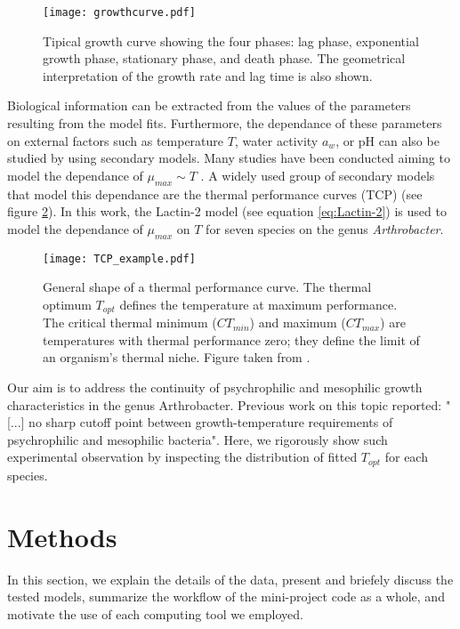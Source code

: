 \documentclass[titlepage,11pt]{article}
\begin{document}
\begin{linenumbers}
		\begin{figure}[h]
			\centering
			\texttt{[image: growthcurve.pdf]}
			\caption{Tipical growth curve showing the four phases: lag phase, exponential growth phase, stationary phase, and death phase. The geometrical interpretation of the growth rate and lag time is also shown.}
			\label{fig:growthcurve}
		\end{figure}
		Biological information can be extracted from the values of the parameters resulting from the model fits. Furthermore, the dependance of these parameters on external factors such as temperature $ T $, water activity $ a_w $, or pH can also be studied by using secondary models. Many studies have been conducted aiming to model the dependance of $ \mu_{max} \sim T $ \cite{Ratkowsky1982, Phillips1987, Stannard1985, DaSilva2018, Zwietering1991, Bernhardt2018, Lactin1995, Valik2013, Logan1976}.  A widely used group of secondary models that model this dependance are the thermal performance curves (TCP) (see figure \ref{fig:TCP_example}). In this work, the Lactin-2 model (see equation \ref{eq:Lactin-2}) is used to model the dependance of $ \mu_{max} $ on $ T $ for seven species on the genus \textit{Arthrobacter}.\\
		\begin{figure}[h]
			\centering
			\texttt{[image: TCP\_example.pdf]}
			\caption{General shape of a thermal performance curve. The thermal optimum $ T_{opt} $ defines the temperature at maximum performance. The critical thermal minimum ($ CT_{min} $) and maximum ($ CT_{max} $) are temperatures with thermal performance zero; they define the limit of an organism's thermal niche. Figure taken from \cite{Krenek2011}.}
			\label{fig:TCP_example}
		\end{figure}
		Our aim is to address the continuity of psychrophilic and mesophilic growth characteristics in the genus Arthrobacter. Previous work on this topic \cite{ROTH1962} reported: "[...] no sharp cutoff point between growth-temperature requirements of psychrophilic and mesophilic bacteria". Here, we rigorously show  such experimental observation by inspecting the distribution of fitted $ T_{opt} $ for each species.\\
		
		\section{Methods}\label{methods}
		
		In this section, we explain the details of the data, present and briefely discuss the tested models, summarize the workflow of the mini-project code as a whole, and motivate the use of each computing tool we employed.\\
		

\end{linenumbers}
\end{document}
